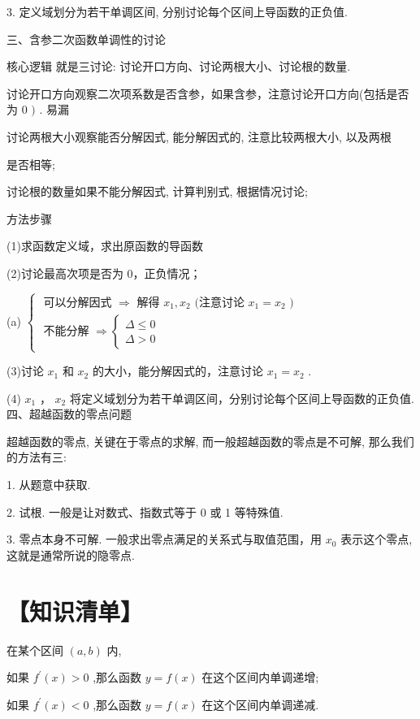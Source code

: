 \documentclass[10pt]{article}
\begin{document}
3. 定义域划分为若干单调区间, 分别讨论每个区间上导函数的正负值.

三、含参二次函数单调性的讨论

核心逻辑 就是三讨论: 讨论开口方向、讨论两根大小、讨论根的数量.

讨论开口方向观察二次项系数是否含参，如果含参，注意讨论开口方向(包括是否为 0 \()\) . 易漏

讨论两根大小观察能否分解因式, 能分解因式的, 注意比较两根大小, 以及两根

是否相等;

讨论根的数量如果不能分解因式, 计算判别式, 根据情况讨论;

方法步骤

(1)求函数定义域，求出原函数的导函数

(2)讨论最高次项是否为 0，正负情况；

(a) \(\left\{  \begin{array}{l} \text{ 可以分解因式 } \Rightarrow  \text{ 解得 }{x}_{1},{x}_{2}\text{ (注意讨论 }{x}_{1} = {x}_{2}\text{ ) } \\  \text{ 不能分解 } \Rightarrow  \left\{  \begin{array}{l} \Delta  \leq  0 \\  \Delta  > 0 \end{array}\right.  \end{array}\right.\)

(3)讨论 \({x}_{1}\) 和 \({x}_{2}\) 的大小，能分解因式的，注意讨论 \({x}_{1} = {x}_{2}\) .

(4) \({x}_{1}\) ， \({x}_{2}\) 将定义域划分为若干单调区间，分别讨论每个区间上导函数的正负值. 四、超越函数的零点问题

超越函数的零点, 关键在于零点的求解, 而一般超越函数的零点是不可解, 那么我们的方法有三:

1. 从题意中获取.

2. 试根. 一般是让对数式、指数式等于 0 或 1 等特殊值.

3. 零点本身不可解. 一般求出零点满足的关系式与取值范围，用 \({x}_{0}\) 表示这个零点, 这就是通常所说的隐零点.

\section*{【知识清单】}

在某个区间 \(\left( {a,b}\right)\) 内,

如果 \({f}^{\prime }\left( x\right)  > 0\) ,那么函数 \(y = f\left( x\right)\) 在这个区间内单调递增;

如果 \({f}^{\prime }\left( x\right)  < 0\) ,那么函数 \(y = f\left( x\right)\) 在这个区间内单调递减.
\end{document}
